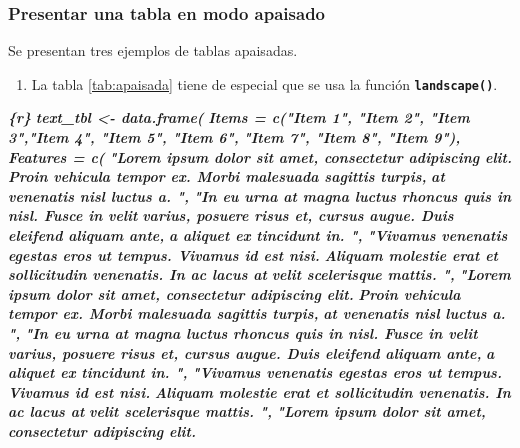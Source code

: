 \documentclass[12pt,a4paper,oneside,]{article}
\newenvironment{Shaded}{\begin{snugshade}}{\end{snugshade}}
\newcommand{\InformationTok}[1]{\textcolor[rgb]{0.56,0.35,0.01}{\textbf{\textit{#1}}}}
\providecommand{\tightlist}{%
  \setlength{\itemsep}{0pt}\setlength{\parskip}{0pt}}
\numberwithin{dummy}{section}
\theoremstyle{ocrenumbox}
\theoremstyle{blacknumex}
\theoremstyle{blacknumbox}
\theoremstyle{ocrenum}
\theoremstyle{ocrenum}
\begin{document}
\hypertarget{presentar-una-tabla-en-modo-apaisado}{%
\subsubsection{Presentar una tabla en modo
apaisado}\label{presentar-una-tabla-en-modo-apaisado}}

Se presentan tres ejemplos de tablas apaisadas.

\begin{enumerate}
\def\labelenumi{\arabic{enumi}.}
\tightlist
\item
  La tabla \ref{tab:apaisada} tiene de especial que se usa la función
  \textbf{\texttt{landscape()}}.
\end{enumerate}

\begin{Shaded}
\begin{Highlighting}[]
\InformationTok{\textasciigrave{}\textasciigrave{}\textasciigrave{}\{r\}}
\InformationTok{text\_tbl \textless{}{-} data.frame(}
\InformationTok{  Items = c("Item 1", "Item 2", "Item 3","Item 4", "Item 5", "Item 6",}
\InformationTok{    "Item 7", "Item 8", "Item 9"), }
\InformationTok{  Features = c(}
\InformationTok{    "Lorem ipsum dolor sit amet, consectetur adipiscing elit.}
\InformationTok{    Proin vehicula tempor ex. Morbi malesuada sagittis turpis,}
\InformationTok{    at venenatis nisl luctus a. ",}
\InformationTok{    "In eu urna at magna luctus rhoncus quis in nisl. Fusce in velit}
\InformationTok{    varius, posuere risus et, cursus augue. Duis eleifend aliquam ante,}
\InformationTok{    a aliquet ex tincidunt in. ",}
\InformationTok{    "Vivamus venenatis egestas eros ut tempus. Vivamus id est nisi.}
\InformationTok{    Aliquam molestie erat et sollicitudin venenatis. In ac lacus at}
\InformationTok{    velit scelerisque mattis. ",}
\InformationTok{    "Lorem ipsum dolor sit amet, consectetur adipiscing elit.}
\InformationTok{    Proin vehicula tempor ex. Morbi malesuada sagittis turpis,}
\InformationTok{    at venenatis nisl luctus a. ",}
\InformationTok{    "In eu urna at magna luctus rhoncus quis in nisl. Fusce in velit}
\InformationTok{    varius, posuere risus et, cursus augue. Duis eleifend aliquam ante,}
\InformationTok{    a aliquet ex tincidunt in. ",}
\InformationTok{    "Vivamus venenatis egestas eros ut tempus. Vivamus id est nisi.}
\InformationTok{    Aliquam molestie erat et sollicitudin venenatis. In ac lacus at}
\InformationTok{    velit scelerisque mattis. ",}
\InformationTok{    "Lorem ipsum dolor sit amet, consectetur adipiscing elit.}

\end{Highlighting}
\end{Shaded}
\end{document}
